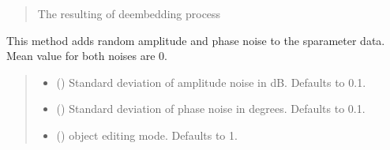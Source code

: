\documentclass[letterpaper,10pt,english]{sphinxmanual}
\begin{document}
\begin{fulllineitems}
\begin{fulllineitems}
\begin{quote}
\begin{description}
\sphinxAtStartPar
The resulting of deembedding process

\sphinxAtStartPar
{\hyperref[\detokenize{touchstone:touchstone.spfile}]{}}

\end{description}\end{quote}

\end{fulllineitems}


\begin{fulllineitems}
\label{\detokenize{touchstone:touchstone.spfile.add_abs_noise}}
\pysigstartsignatures
{}
\pysigstopsignatures
\sphinxAtStartPar
This method adds random amplitude and phase noise to the s\sphinxhyphen{}parameter data.
Mean value for both noises are 0.
\begin{quote}\begin{description}
\begin{itemize}
\item {} 
\sphinxAtStartPar
{} (\sphinxstyleliteralemphasis{\sphinxupquote{, }}) \textendash{} Standard deviation of amplitude noise in dB. Defaults to 0.1.

\item {} 
\sphinxAtStartPar
{} (\sphinxstyleliteralemphasis{\sphinxupquote{, }}) \textendash{} Standard deviation of phase noise in degrees. Defaults to 0.1.

\item {} 
\sphinxAtStartPar
{} (\sphinxstyleliteralemphasis{\sphinxupquote{, }}) \textendash{} object editing mode. Defaults to \sphinxhyphen{}1.


\end{itemize}
\end{description}
\end{quote}
\end{fulllineitems}
\end{fulllineitems}
\end{document}
